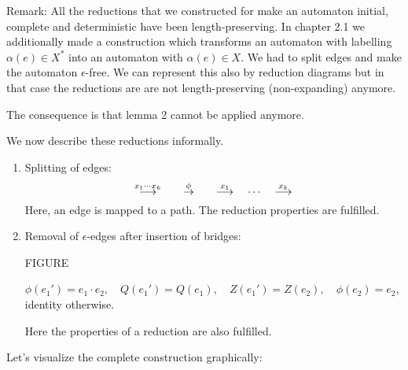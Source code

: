 \begin{center}
\end{center}

Remark: All the reductions that we constructed for make an automaton initial,
complete and deterministic have been length-preserving. In chapter 2.1 we
additionally made a construction which transforms an automaton with labelling
$\alpha(e) \in X^*$ into an automaton with $\alpha(e) \in X$. We had to split
edges and make the automaton $\epsilon$-free. We can represent this also by
reduction diagrams but in that case the reductions are are not length-preserving
(non-expanding) anymore.

The consequence is that lemma 2 cannot be applied anymore.

We now describe these reductions informally.

\begin{enumerate}
  \item Splitting of edges:
  \[ \stackrel{x_1 \cdots x_k}{\longrightarrow} \qquad\stackrel{\phi}{\to}\qquad \stackrel{x_1}{\longrightarrow}\quad
  \cdots\quad \stackrel{x_k}{\longrightarrow} \] Here, an edge is mapped to a path. The reduction
  properties are fulfilled.
  \item Removal of $\epsilon$-edges after insertion of bridges:
  
  FIGURE
  
  $\phi(e_1') = e_1 \cdot e_2,\quad Q(e_1') = Q(e_1),\quad Z(e_1') =
  Z(e_2),\quad \phi(e_2) = e_2$, identity otherwise.
  
  Here the properties of a reduction are also fulfilled.
\end{enumerate}

Let's visualize the complete construction graphically:

\begin{center}
\end{center}

